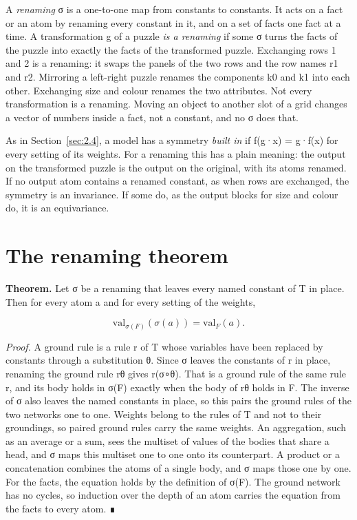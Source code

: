 A \emph{renaming} σ is a one-to-one map from constants to constants. It acts on a fact or an atom by renaming every constant in it, and on a set of facts one fact at a time. A transformation g of a puzzle \emph{is a renaming} if some σ turns the facts of the puzzle into exactly the facts of the transformed puzzle. Exchanging rows 1 and 2 is a renaming: it swaps the panels of the two rows and the row names r1 and r2. Mirroring a left-right puzzle renames the components k0 and k1 into each other. Exchanging size and colour renames the two attributes. Not every transformation is a renaming. Moving an object to another slot of a grid changes a vector of numbers inside a fact, not a constant, and no σ does that.

As in Section~\ref{sec:2.4}, a model has a symmetry \emph{built in} if f(g·x) = g·f(x) for every setting of its weights. For a renaming this has a plain meaning: the output on the transformed puzzle is the output on the original, with its atoms renamed. If no output atom contains a renamed constant, as when rows are exchanged, the symmetry is an invariance. If some do, as the output blocks for size and colour do, it is an equivariance.

\section{The renaming theorem}\label{sec:3.2}

\textbf{Theorem.} Let σ be a renaming that leaves every named constant of T in place. Then for every atom a and for every setting of the weights,

\[ \mathrm{val}_{\sigma(F)}(\sigma(a)) = \mathrm{val}_F(a). \]

\emph{Proof.} A ground rule is a rule r of T whose variables have been replaced by constants through a substitution θ. Since σ leaves the constants of r in place, renaming the ground rule rθ gives r(σ∘θ). That is a ground rule of the same rule r, and its body holds in σ(F) exactly when the body of rθ holds in F. The inverse of σ also leaves the named constants in place, so this pairs the ground rules of the two networks one to one. Weights belong to the rules of T and not to their groundings, so paired ground rules carry the same weights. An aggregation, such as an average or a sum, sees the multiset of values of the bodies that share a head, and σ maps this multiset one to one onto its counterpart. A product or a concatenation combines the atoms of a single body, and σ maps those one by one. For the facts, the equation holds by the definition of σ(F). The ground network has no cycles, so induction over the depth of an atom carries the equation from the facts to every atom. ∎

